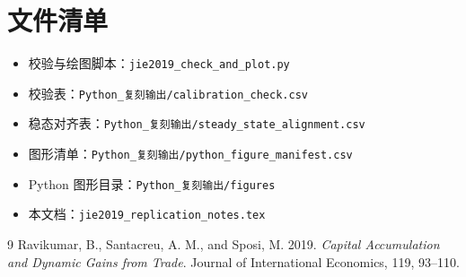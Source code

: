 \documentclass[UTF8,12pt,a4paper]{ctexart}
\begin{document}
\section{文件清单}

\begin{itemize}
  \item 校验与绘图脚本：\texttt{jie2019\_check\_and\_plot.py}
  \item 校验表：\texttt{Python\_复刻输出/calibration\_check.csv}
  \item 稳态对齐表：\texttt{Python\_复刻输出/steady\_state\_alignment.csv}
  \item 图形清单：\texttt{Python\_复刻输出/python\_figure\_manifest.csv}
  \item Python 图形目录：\texttt{Python\_复刻输出/figures}
  \item 本文档：\texttt{jie2019\_replication\_notes.tex}
\end{itemize}

\begin{thebibliography}{9}
Ravikumar, B., Santacreu, A. M., and Sposi, M. 2019.
\textit{Capital Accumulation and Dynamic Gains from Trade}.
Journal of International Economics, 119, 93--110.
\end{thebibliography}
\end{document}

